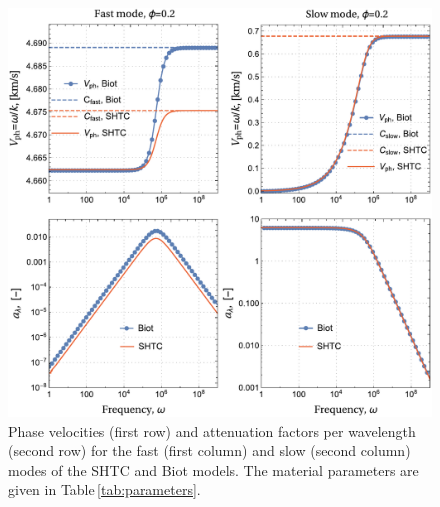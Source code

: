 \documentclass[3p,times,table]{article}
\begin{document}
\begin{figure}[!htbp]
	\begin{center}
			\includegraphics[draft=false,trim=0 0 0 0,clip, 
			scale=0.42]{Figures/Vph-AttenuationLog}
		\caption{Phase velocities (first row) and attenuation factors per 
			wavelength (second row) for the fast (first column) and slow 
			(second column) modes of the SHTC and Biot models. The material 
			parameters are given in Table\,\ref{tab:parameters}.  
		}  
		\label{fig:Vph.Attenuation}
	\end{center}
\end{figure}



%		
\end{document}
